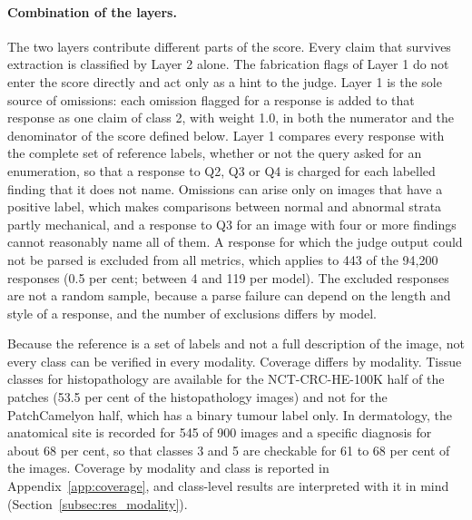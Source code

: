 \documentclass[11pt,a4paper]{article}
\providecommand{\Nresponses}{94{,}200}
\begin{document}
\paragraph{Combination of the layers.} The two layers contribute different parts of the score. Every claim that survives extraction is classified by Layer 2 alone. The fabrication flags of Layer 1 do not enter the score directly and act only as a hint to the judge. Layer 1 is the sole source of omissions: each omission flagged for a response is added to that response as one claim of class 2, with weight 1.0, in both the numerator and the denominator of the score defined below. Layer 1 compares every response with the complete set of reference labels, whether or not the query asked for an enumeration, so that a response to Q2, Q3 or Q4 is charged for each labelled finding that it does not name. Omissions can arise only on images that have a positive label, which makes comparisons between normal and abnormal strata partly mechanical, and a response to Q3 for an image with four or more findings cannot reasonably name all of them. A response for which the judge output could not be parsed is excluded from all metrics, which applies to 443 of the \Nresponses{} responses (0.5 per cent; between 4 and 119 per model). The excluded responses are not a random sample, because a parse failure can depend on the length and style of a response, and the number of exclusions differs by model.

Because the reference is a set of labels and not a full description of the image, not every class can be verified in every modality. Coverage differs by modality. Tissue classes for histopathology are available for the NCT-CRC-HE-100K half of the patches (53.5 per cent of the histopathology images) and not for the PatchCamelyon half, which has a binary tumour label only. In dermatology, the anatomical site is recorded for 545 of 900 images and a specific diagnosis for about 68 per cent, so that classes 3 and 5 are checkable for 61 to 68 per cent of the images. Coverage by modality and class is reported in Appendix~\ref{app:coverage}, and class-level results are interpreted with it in mind (Section~\ref{subsec:res_modality}).
\end{document}
